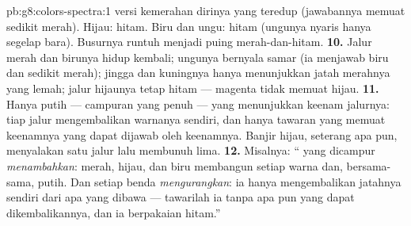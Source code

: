 \begin{solution}{pb:g8:colors-spectra:1}
versi kemerahan dirinya yang teredup (jawabannya memuat sedikit
merah). Hijau: hitam. Biru dan ungu: hitam (ungunya nyaris hanya
segelap bara). Busurnya runtuh menjadi puing merah-dan-hitam.
\textbf{10.} Jalur merah dan birunya hidup kembali; ungunya bernyala
samar (ia menjawab biru dan sedikit merah); jingga dan kuningnya hanya
menunjukkan jatah merahnya yang lemah; jalur hijaunya tetap hitam ---
 magenta tidak memuat hijau.
\textbf{11.} Hanya  putih --- campuran yang penuh --- yang
menunjukkan keenam jalurnya: tiap jalur mengembalikan warnanya
sendiri, dan hanya tawaran yang memuat keenamnya yang dapat dijawab
oleh keenamnya. Banjir hijau, seterang apa pun, menyalakan satu jalur
lalu membunuh lima.
\textbf{12.} Misalnya: `` yang dicampur \emph{menambahkan}:
merah, hijau, dan biru membangun setiap warna dan, bersama-sama,
putih. Dan setiap benda \emph{mengurangkan}: ia hanya mengembalikan
jatahnya sendiri dari apa yang dibawa  --- tawarilah ia tanpa
apa pun yang dapat dikembalikannya, dan ia berpakaian hitam.''
\end{solution}
